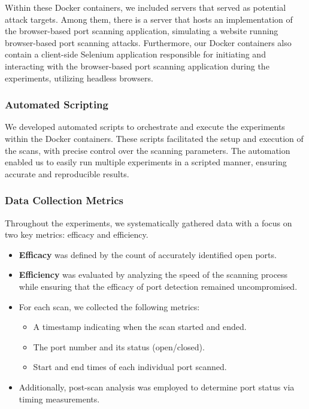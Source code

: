 Within these Docker containers, we included servers that served as potential attack targets. Among them, there is a server that hosts an implementation of the browser-based port scanning application, simulating a website running browser-based port scanning attacks. Furthermore, our Docker containers also contain a client-side Selenium application responsible for initiating and interacting with the browser-based port scanning application during the experiments, utilizing headless browsers.

\subsubsection{Automated Scripting}

We developed automated scripts to orchestrate and execute the experiments within the Docker containers. These scripts facilitated the setup and execution of the scans, with precise control over the scanning parameters.
The automation enabled us to easily run multiple experiments in a scripted manner, ensuring accurate and reproducible results.

\subsubsection{Data Collection Metrics}

Throughout the experiments, we systematically gathered data with a focus on two key metrics: efficacy and efficiency.

\begin{itemize}
    \item \textbf{Efficacy} was defined by the count of accurately identified open ports.
    \item \textbf{Efficiency} was evaluated by analyzing the speed of the scanning process while ensuring that the efficacy of port detection remained uncompromised.
    \item For each scan, we collected the following metrics:
    \begin{itemize}
        \item A timestamp indicating when the scan started and ended.
        \item The port number and its status (open/closed).
        \item Start and end times of each individual port scanned.
    \end{itemize}
    \item Additionally, post-scan analysis was employed to determine port status via timing measurements.
\end{itemize}


